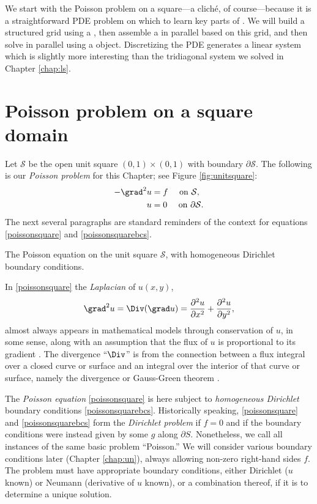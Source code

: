 
We start with the Poisson problem on a square---a clich\'e, of course---because it is a straightforward PDE problem on which to learn key parts of \PETSc.  We will build a structured grid using a \pDMDA, then assemble a \pMat in parallel based on this grid, and then solve in parallel using a \pKSP object.  Discretizing the PDE generates a linear system which is slightly more interesting than the tridiagonal system we solved in Chapter \ref{chap:ls}.

\section{Poisson problem on a square domain}

Let $\mathcal{S}$ be the open unit square $(0,1)\times(0,1)$ with boundary $\partial\mathcal{S}$.  The following is our \emph{Poisson problem} for this Chapter;  see Figure \ref{fig:unitsquare}:
\begin{align}
- \grad^2 u &= f \quad \text{ on } \mathcal{S}, \label{poissonsquare} \\
u &= 0 \quad \text{ on } \partial \mathcal{S}. \label{poissonsquarebcs}
\end{align}
The next several paragraphs are standard reminders of the context for equations \eqref{poissonsquare} and \eqref{poissonsquarebcs}.

\begin{marginfigure}

\caption{The Poisson equation on the unit square $\mathcal{S}$, with homogeneous Dirichlet boundary conditions.}
\label{fig:unitsquare}
\end{marginfigure}

In \eqref{poissonsquare} the \emph{Laplacian} of $u(x,y)$,
\begin{equation}
  \grad^2 u = \Div(\grad u) = \frac{\partial^2 u}{\partial x^2} + \frac{\partial^2 u}{\partial y^2},  \label{eq:st:lapdefn}
\end{equation}
almost always appears in mathematical models through conservation of $u$, in some sense, along with an assumption that the flux of $u$ is proportional to its gradient \citep{Ockendonetal2003}.  The divergence ``$\Div$'' is from the connection between a flux integral over a closed curve or surface and an integral over the interior of that curve or surface, namely the divergence or Gauss-Green theorem \citep[Appendix C]{Evans2010}.

The \emph{Poisson equation} \eqref{poissonsquare} is here subject to \emph{homogeneous Dirichlet} boundary conditions \eqref{poissonsquarebcs}.  Historically speaking, \eqref{poissonsquare} and \eqref{poissonsquarebcs} form the \emph{Dirichlet problem} if $f=0$ and if the boundary conditions were instead given by some $g$ along $\partial S$.  Nonetheless, we call all instances of the same basic problem ``Poisson.''  We will consider various boundary conditions later (Chapter \ref{chap:un}), always allowing non-zero right-hand sides $f$.  The problem must have appropriate boundary conditions, either Dirichlet ($u$ known) or Neumann (derivative of $u$ known), or a combination thereof, if it is to determine a unique solution.

